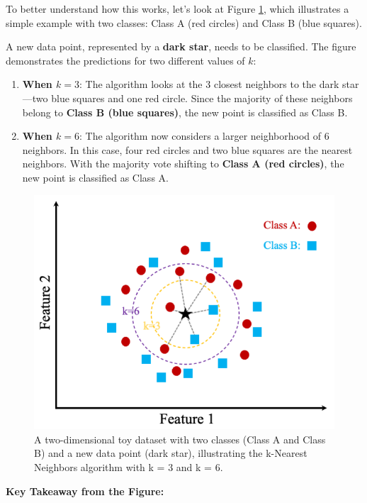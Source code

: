 \documentclass[
]{book}
\providecommand{\tightlist}{%
  \setlength{\itemsep}{0pt}\setlength{\parskip}{0pt}}
\theoremstyle{definition}
\theoremstyle{definition}
\theoremstyle{definition}
\theoremstyle{definition}
\theoremstyle{remark}
\begin{document}
To better understand how this works, let's look at Figure \ref{fig:knn-image}, which illustrates a simple example with two classes: {Class A (red circles)} and {Class B (blue squares)}.

A new data point, represented by a \textbf{dark star}, needs to be classified. The figure demonstrates the predictions for two different values of \(k\):

\begin{enumerate}
\def\labelenumi{\arabic{enumi}.}
\tightlist
\item
  \textbf{When \(k = 3\)}: The algorithm looks at the 3 closest neighbors to the dark star---two blue squares and one red circle. Since the majority of these neighbors belong to \textbf{Class B (blue squares)}, the new point is classified as Class B.\\
\item
  \textbf{When \(k = 6\)}: The algorithm now considers a larger neighborhood of 6 neighbors. In this case, four red circles and two blue squares are the nearest neighbors. With the majority vote shifting to \textbf{Class A (red circles)}, the new point is classified as Class A.
\end{enumerate}

\begin{figure}

{\centering \includegraphics[width=0.75\linewidth]{images/knn} 

}

\caption{A two-dimensional toy dataset with two classes (Class A and Class B) and a new data point (dark star), illustrating the k-Nearest Neighbors algorithm with k = 3 and k = 6.}\label{fig:knn-image}
\end{figure}

\textbf{Key Takeaway from the Figure:}
\end{document}
